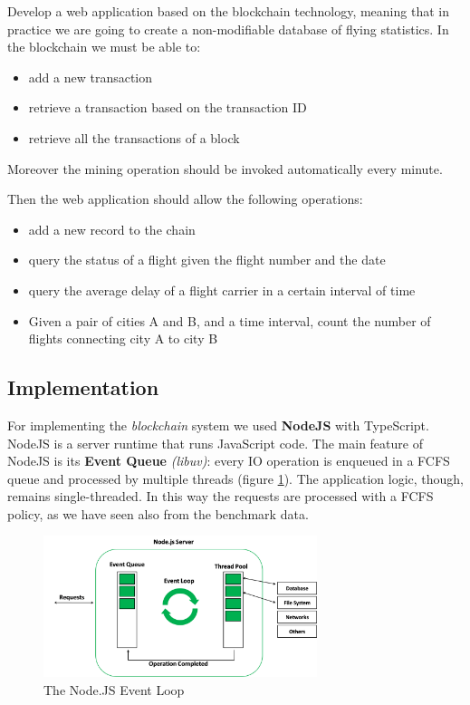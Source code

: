 \documentclass[11pt]{scrartcl} %
\begin{document}
Develop a web application based on the blockchain technology, meaning that in practice we are going to create a non-modifiable database of flying statistics. In the blockchain we must be able to:
\begin{itemize}
\item[\adforn{43}] add a new transaction
\item[\adforn{43}] retrieve a transaction based on the transaction ID
\item[\adforn{43}] retrieve all the transactions of a block
\end{itemize}

Moreover the mining operation should be invoked automatically every minute. 

Then the web application should allow the following operations:
\begin{itemize}
\item[\adforn{43}] add a new record to the chain
\item[\adforn{43}] query the status of a flight given the flight number and the date
\item[\adforn{43}] query the average delay of a flight carrier in a certain interval of time
\item[\adforn{43}] Given a pair of cities A and B, and a time interval, count the number of flights connecting city A to city B
\end{itemize}

\subsection{Implementation}

For implementing the \textit{blockchain} system we used \textbf{NodeJS} with TypeScript. NodeJS is a server runtime that runs JavaScript code. The main feature of NodeJS is its \textbf{Event Queue} \textit{(libuv)}: every IO operation is enqueued in a FCFS queue and processed by multiple threads (figure \ref{fig:eventloop}). The application logic, though, remains single-threaded. In this way the requests are processed with a FCFS policy, as we have seen also from the benchmark data.

\begin{figure}[h]
\includegraphics[width=8cm]{Images/eventloop.png}
\centering
\caption{The Node.JS Event Loop}
\label{fig:eventloop}
\end{figure}
\end{document}
